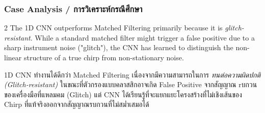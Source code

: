 \subsubsection*{Case Analysis \quad / \quad \textthai{การวิเคราะห์กรณีศึกษา}}
\begin{paracol}{2}
The 1D CNN outperforms Matched Filtering primarily because it is \textit{glitch-resistant}. While a standard matched filter might trigger a false positive due to a sharp instrument noise ("glitch"), the CNN has learned to distinguish the non-linear structure of a true chirp from non-stationary noise.

\switchcolumn

\begin{thai}
1D CNN ทำงานได้ดีกว่า Matched Filtering เนื่องจากมีความสามารถในการ \textit{ทนต่อความผิดปกติ (Glitch-resistant)} ในขณะที่ตัวกรองแบบคลาสสิกอาจเกิด False Positive จากสัญญาณ rบกวนของเครื่องมือที่แหลมคม (Glitch) แต่ CNN ได้เรียนรู้ที่จะแยกแยะโครงสร้างที่ไม่เชิงเส้นของ Chirp ที่แท้จริงออกจากสัญญาณรบกวนที่ไม่สม่ำเสมอได้
\end{thai}
\end{paracol}
